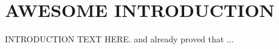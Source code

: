 \singlespacing

\chapter{AWESOME INTRODUCTION}

INTRODUCTION TEXT HERE. \textcite{moran1958random} and \textcite{zipf1935psycho} already proved that ...